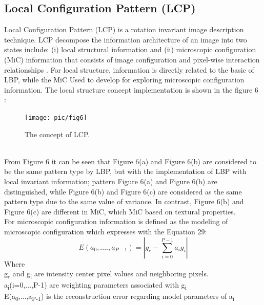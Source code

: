 \documentclass[review]{elsarticle}
\begin{document}
\subsection{Local Configuration Pattern (LCP)}
Local Configuration Pattern (LCP) is a rotation invariant image description technique. LCP decompose the information architecture of an image into two states include: (i) local structural information and (ii) microscopic configuration (MiC) information that consists of image configuration and pixel-wise interaction relationships \cite{Guo2011}. For local structure, information is directly related to the basic of LBP, while the MiC Used to develop for exploring microscopic configuration information. 
The local structure concept implementation is shown in the figure 6 :
\begin{figure}[h!]
	\centering
	\texttt{[image: pic/fig6]}
	\caption{The concept of LCP.}
	\label{fig:fig6}
\end{figure} \\
From Figure 6 it can be seen that Figure 6(a) and Figure 6(b) are considered to be the same pattern type by LBP, but with the implementation of LBP with local invariant information; pattern Figure 6(a) and Figure 6(b) are distinguished, while Figure 6(b) and Figure 6(c) are considered as the same pattern type due to the same value of variance. In contrast, Figure 6(b) and Figure 6(c) are different in MiC, which MiC based on textural properties. \\

For microscopic configuration information is defined as the modeling of microscopic configuration which expresses with the Equation 29: 
\begin{equation}
E(a_0,....,a_{P-1}) = |g_c - \sum_{i=0}^{P-1} a_ig_i|
\end{equation}
Where \\
g\textsubscript{c} and g\textsubscript{i} are intensity center pixel values and neighboring pixels.\\
a\textsubscript{i}(i=0,...,P-1) are weighting parameters associated with g\textsubscript{i} \\
E(a\textsubscript{0},...,a\textsubscript{P-1}) is the reconstruction error regarding model parameters of a\textsubscript{i}
\end{document}
